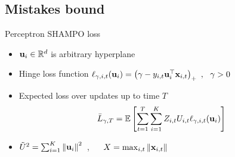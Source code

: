 \documentclass{beamer}
\begin{document}
\subsection{Mistakes bound}
\begin{frame}{Perceptron SHAMPO  loss}
\begin{itemize}
\item $\mathbf{u}_i\in\mathbb{R}^d$ is arbitrary hyperplane \newline
\item Hinge loss function $\ell_{\gamma,i,t}(\mathbf{u}_{i})= \left({\gamma-y_{i,t}
  {\mathbf{u}}^{\top}_{i}\mathbf{x}_{i,t}}\right)_{+}~,~~\gamma>0$ \newline
\item Expected loss over updates up to time $T$
\begin{equation*}
 \bar{L}_{\gamma,T}=\mathbb{E}\brackets{\sum_{t=1}^T \sum_{i=1}^{K}{Z_{i,t}U_{i,t}\lossp{\gamma,i,t}(\vui{i})}}\newline
\end{equation*}
\item $\tilde{U}^2=\sum_{i=1}^{K}\left\Vert {\mathbf{u}_{i}} \right\Vert^2$~, ~~ $X=\max_{i,t}\Vert\mathbf{x}_{i,t}\Vert$
\end{itemize}
\end{frame}


%
\end{document}
